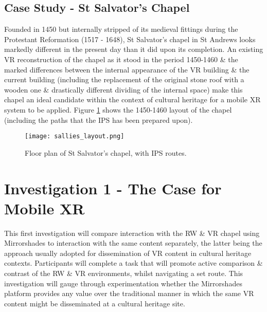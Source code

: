 
\subsection{Case Study - St Salvator's Chapel}
Founded in 1450 but internally stripped of its medieval fittings during the Protestant Reformation (1517 - 1648), St Salvator's chapel in St Andrews looks markedly different in the present day than it did upon its completion. An existing VR reconstruction of the chapel as it stood in the period 1450-1460 \& the marked differences between the internal appearance of the VR building \& the current building (including the replacement of the original stone roof with a wooden one \& drastically different dividing of the internal space) make this chapel an ideal candidate within the context of cultural heritage for a mobile XR system to be applied. Figure \ref{sallies_layout} shows the 1450-1460 layout of the chapel (including the paths that the IPS has been prepared upon).

\begin{figure}[h]
	\begin{center}
		\texttt{[image: sallies\_layout.png]}
		\caption{Floor plan of St Salvator's chapel, with IPS routes.}
		\label{sallies_layout}
	\end{center}
\end{figure}


\section{Investigation 1 - The Case for Mobile XR}
\label{investigation1}
This first investigation will compare interaction with the RW \& VR chapel using Mirrorshades to interaction with the same content separately, the latter being the approach usually adopted for dissemination of VR content in cultural heritage contexts. Participants will complete a task that will promote active comparison \& contrast of the RW \& VR environments, whilst navigating a set route. This investigation will gauge through experimentation whether the Mirrorshades platform provides any value over the traditional manner in which the same VR content might be disseminated at a cultural heritage site.

